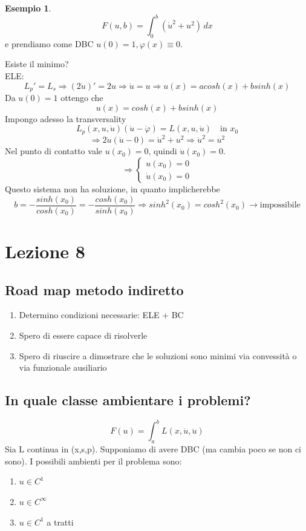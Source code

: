 \documentclass[a4paper]{book}
\theoremstyle{definition}
\newtheorem{ex}{Esempio}
\theoremstyle{remark}
\theoremstyle{definition}
\newcommand{\ra}{\Rightarrow}
\begin{document}
\begin{ex}
\[
	F(u, b) = \int_{0}^{b}(\dot{u}^2 + u^2)\, dx
\]
e prendiamo come DBC $u(0) = 1, \varphi(x)\equiv 0 $.\\

Esiste il minimo?\\
ELE: $$L_p' = L_s \ra (2\dot{u})' = 2u \ra \ddot{u} = u \ra u(x) = a cosh(x) + b sinh(x)$$
Da $u(0) = 1$ ottengo che 
\[
	u(x) = cosh(x) + bsinh(x)
\]
Impongo adesso la transversality
\[
	L_p(x, u, \dot{u}) (\dot{u} - \dot{\varphi} ) = L(x, u, \dot{u})\quad\text{in }x_0	
\]
\[
	\ra 2\dot{u}(\dot{u} - 0) = \dot{u}^2 + u^2 \ra \dot{u}^2 = u^2
\]
Nel punto di contatto vale $u(x_0) = 0$, quindi $\dot{u}(x_0)=0$.
\[
 	\ra 
 	\begin{cases}
 	u(x_0) = 0 \\
 	\dot{u}(x_0) = 0
 	\end{cases}
 \] 
 Questo sistema non ha soluzione, in quanto implicherebbe
 \[
 	b = - \frac{sinh(x_0)}{cosh(x_0)} = -\frac{cosh(x_0)}{sinh(x_0)} \ra sinh^2(x_0) = cosh^2(x_0)\to \text{impossibile}
 \]
\end{ex}

\chapter{Lezione 8}
\section{Road map metodo indiretto}
\begin{enumerate}
	\item Determino condizioni necessarie: ELE + BC
	\item Spero di essere capace di risolverle
	\item Spero di riuscire a dimostrare che le soluzioni sono minimi via convessità o via funzionale ausiliario
\end{enumerate}

\section{In quale classe ambientare i problemi?}
$$ F(u) = \int_{a}^{b} L(x, \dot{u}, \ddot{u})$$
Sia L continua in (x,s,p). Supponiamo di avere DBC (ma cambia poco se non ci sono). I possibili ambienti per il problema sono:
\begin{enumerate}
	\item $ u \in C^1 $
	\item $ u \in C^\infty $
	\item $ u \in C^1 $ a tratti
\end{enumerate} 
\end{document}
